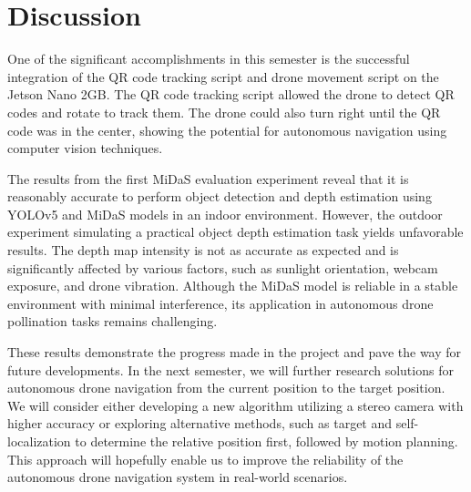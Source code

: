 \section{Discussion}

One of the significant accomplishments in this semester is the successful integration of the QR code tracking script and drone movement script on the Jetson Nano 2GB. The QR code tracking script allowed the drone to detect QR codes and rotate to track them. The drone could also turn right until the QR code was in the center, showing the potential for autonomous navigation using computer vision techniques.

The results from the first MiDaS evaluation experiment reveal that it is reasonably accurate to perform object detection and depth estimation using YOLOv5 and MiDaS models in an indoor environment. However, the outdoor experiment simulating a practical object depth estimation task yields unfavorable results. The depth map intensity is not as accurate as expected and is significantly affected by various factors, such as sunlight orientation, webcam exposure, and drone vibration. Although the MiDaS model is reliable in a stable environment with minimal interference, its application in autonomous drone pollination tasks remains challenging.

These results demonstrate the progress made in the project and pave the way for future developments. In the next semester, we will further research solutions for autonomous drone navigation from the current position to the target position. We will consider either developing a new algorithm utilizing a stereo camera with higher accuracy or exploring alternative methods, such as target and self-localization to determine the relative position first, followed by motion planning. This approach will hopefully enable us to improve the reliability of the autonomous drone navigation system in real-world scenarios.